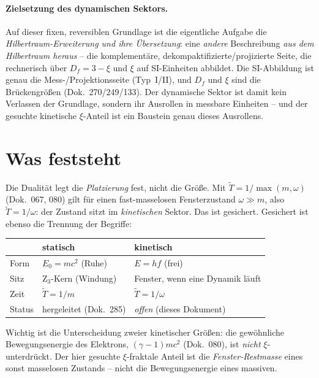 \paragraph{Zielsetzung des dynamischen Sektors.} Auf dieser fixen, reversiblen Grundlage ist die
eigentliche Aufgabe die \emph{Hilbertraum-Erweiterung und ihre Übersetzung}: eine \emph{andere} Beschreibung \emph{aus dem Hilbertraum heraus} --
die komplementäre, dekompaktifizierte/projizierte Seite, die rechnerisch über $D_f=3-\xi$ und $\xi$
auf SI-Einheiten abbildet. Die SI-Abbildung ist genau die Mess-/Projektionsseite (Typ~I/II), und
$D_f$ und $\xi$ sind die Brückengrößen (Dok.~270/249/133). Der dynamische Sektor ist damit kein
Verlassen der Grundlage, sondern ihr Ausrollen in messbare Einheiten -- und der gesuchte kinetische
$\xi$-Anteil ist ein Baustein genau dieses Ausrollens.

\section{Was feststeht}
Die Dualität legt die \emph{Platzierung} fest, nicht die Größe. Mit $\tilde T=1/\max(m,\omega)$
(Dok.~067, 080) gilt für einen fast-masselosen Fensterzustand $\omega\gg m$, also
$\tilde T=1/\omega$: der Zustand sitzt im \emph{kinetischen} Sektor. Das ist gesichert. Gesichert
ist ebenso die Trennung der Begriffe:
\begin{center}
\begin{tabular}{lll}
\toprule
 & statisch & kinetisch \\
\midrule
Form        & $E_0=mc^2$ (Ruhe)            & $E=hf$ (frei) \\
Sitz        & Z$_3$-Kern (Windung)         & Fenster, wenn eine Dynamik läuft \\
Zeit        & $\tilde T=1/m$               & $\tilde T=1/\omega$ \\
Status      & hergeleitet (Dok.~285)       & \emph{offen} (dieses Dokument) \\
\bottomrule
\end{tabular}
\end{center}
Wichtig ist die Unterscheidung zweier kinetischer Größen: die gewöhnliche Bewegungsenergie des
Elektrons, $(\gamma-1)mc^2$ (Dok.~080), ist \emph{nicht} $\xi$-unterdrückt. Der hier gesuchte
$\xi$-fraktale Anteil ist die \emph{Fenster-Restmasse} eines sonst masselosen Zustands -- nicht die
Bewegungsenergie eines massiven.

